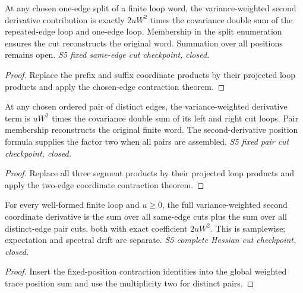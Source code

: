 \begin{lemma}
  \label{lem:loop-same-edge-position-cut}
  \leanok
  At any chosen one-edge split of a finite loop word, the variance-weighted
  second derivative contribution is exactly $2uW^2$ times the covariance
  double sum of the repeated-edge loop and one-edge loop. Membership in the
  split enumeration ensures the cut reconstructs the original word.
  Summation over all positions remains open.
  \emph{S5 fixed same-edge cut checkpoint, closed.}
\end{lemma}
\begin{proof}\leanok
  Replace the prefix and suffix coordinate products by their projected loop
  products and apply the chosen-edge contraction theorem.
\end{proof}

\begin{lemma}
  \label{lem:loop-pair-position-cut}
  \leanok
  At any chosen ordered pair of distinct edges, the variance-weighted
  derivative term is $uW^2$ times the covariance double sum of its left and
  right cut loops. Pair membership reconstructs the original finite word.
  The second-derivative position formula supplies the factor two when all
  pairs are assembled. \emph{S5 fixed pair cut checkpoint, closed.}
\end{lemma}
\begin{proof}\leanok
  Replace all three segment products by their projected loop products and
  apply the two-edge coordinate contraction theorem.
\end{proof}

\begin{lemma}
  \label{lem:loop-second-all-cuts}
  \leanok
  For every well-formed finite loop and $u\ge0$, the full variance-weighted
  second coordinate derivative is the sum over all same-edge cuts plus the
  sum over all distinct-edge pair cuts, both with exact coefficient
  $2uW^2$. This is samplewise; expectation and spectral drift are separate.
  \emph{S5 complete Hessian cut checkpoint, closed.}
\end{lemma}
\begin{proof}\leanok
  Insert the fixed-position contraction identities into the global weighted
  trace position sum and use the multiplicity two for distinct pairs.
\end{proof}

